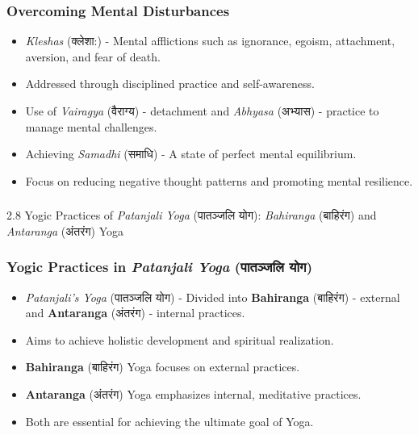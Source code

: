 \begin{frame}[fragile]\frametitle{Overcoming Mental Disturbances}

      \begin{itemize}
		\item \textit{Kleshas} (क्लेशा:) - Mental afflictions such as ignorance, egoism, attachment, aversion, and fear of death.
		\item Addressed through disciplined practice and self-awareness.
		\item Use of \textit{Vairagya} (वैराग्य) - detachment and \textit{Abhyasa} (अभ्यास) - practice to manage mental challenges.
		\item Achieving \textit{Samadhi} (समाधि) - A state of perfect mental equilibrium.
		\item Focus on reducing negative thought patterns and promoting mental resilience.
	  \end{itemize}

\end{frame}

\begin{frame}[fragile]\frametitle{}
\begin{center}
{\Large 2.8  Yogic Practices of \textit{Patanjali Yoga} (पातञ्जलि योग): \textit{Bahiranga} (बाहिरंग) and \textit{Antaranga} (अंतरंग) Yoga}
\end{center}
\end{frame}

\begin{frame}[fragile]\frametitle{Yogic Practices in \textit{Patanjali Yoga} (पातञ्जलि योग)}

      \begin{itemize}
		\item \textit{Patanjali’s Yoga} (पातञ्जलि योग) - Divided into \textbf{Bahiranga} (बाहिरंग) - external and \textbf{Antaranga} (अंतरंग) - internal practices.
		\item Aims to achieve holistic development and spiritual realization.
		\item \textbf{Bahiranga} (बाहिरंग) Yoga focuses on external practices.
		\item \textbf{Antaranga} (अंतरंग) Yoga emphasizes internal, meditative practices.
		\item Both are essential for achieving the ultimate goal of Yoga.
	  \end{itemize}

\end{frame}


